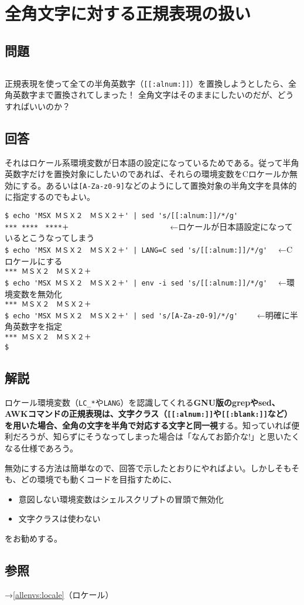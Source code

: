 \section{全角文字に対する正規表現の扱い}

\subsection*{問題}
\noindent
$\!\!\!\!\!$
\begin{grshfboxit}{160.0mm}
	正規表現を使って全ての半角英数字（\verb|[[:alnum:]]|）を置換しようとしたら、全角英数字まで置換されてしまった！
	全角文字はそのままにしたいのだが、どうすればいいのか？
\end{grshfboxit}

\subsection*{回答}
それはロケール系環境変数が日本語の設定になっているためである。従って半角英数字だけを置換対象にしたいのであれば、それらの環境変数をCロケールか無効にする。あるいは\verb|[A-Za-z0-9]|などのようにして置換対象の半角文字を具体的に指定するのでもよい。
\begin{screen}
	\verb!$ echo 'MSX ＭＳＸ２　ＭＳＸ２＋' | sed 's/[[:alnum:]]/*/g'! \return \\
	\verb!*** ****　****＋! 　　　　　　　　　　　　←ロケールが日本語設定になっているとこうなってしまう \\
	\verb!$ echo 'MSX ＭＳＸ２　ＭＳＸ２＋' | LANG=C sed 's/[[:alnum:]]/*/g'! \return 　←Cロケールにする \\
	\verb!*** ＭＳＸ２　ＭＳＸ２＋! \\
	\verb!$ echo 'MSX ＭＳＸ２　ＭＳＸ２＋' | env -i sed 's/[[:alnum:]]/*/g'! \return 　←環境変数を無効化 \\
	\verb!*** ＭＳＸ２　ＭＳＸ２＋! \\
	\verb!$ echo 'MSX ＭＳＸ２　ＭＳＸ２＋' | sed 's/[A-Za-z0-9]/*/g'! \return 　　←明確に半角英数字を指定 \\
	\verb!*** ＭＳＸ２　ＭＳＸ２＋! \\
	\verb!$ !
\end{screen}

\subsection*{解説}

ロケール環境変数（\verb|LC_*|や\verb|LANG|）を認識してくれる\textbf{GNU版のgrepやsed、AWKコマンドの正規表現は、文字クラス（\verb|[[:alnum:]]|や\verb|[[:blank:]]|など）を用いた場合、全角の文字を半角で対応する文字と同一視}する。知っていれば便利だろうが、知らずにそうなってしまった場合は「なんてお節介な!」と思いたくなる仕様であろう。

無効にする方法は簡単なので、回答で示したとおりにやればよい。しかしそもそも、どの環境でも動くコードを目指すために、
\begin{itemize}
  \item 意図しない環境変数はシェルスクリプトの冒頭で無効化
  \item 文字クラスは使わない
\end{itemize}
をお勧めする。

\subsection*{参照}

\noindent
→\ref{allenvs:locale}（ロケール）
